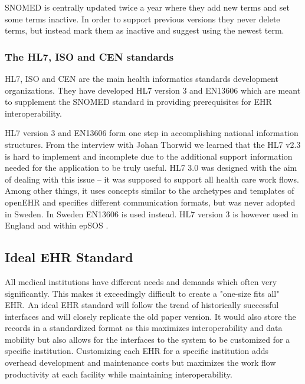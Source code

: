 \documentclass[14pt]{article}
\begin{document}
\gls{SNOMED} is centrally updated twice a year where they add new terms and set some terms inactive. In order to support previous versions they never delete terms, but instead mark them as inactive and suggest using the newest term.\cite{annavik}

\subsubsection{The HL7, ISO and CEN standards}
\gls{HL7}, \gls{ISO} and \gls{CEN} are the main health informatics standards development organizations. They have developed \gls{HL7} version 3 and \gls{EN13606} which are meant to supplement the \gls{SNOMED} standard in providing prerequisites for \gls{EHR} \gls{interoperability}.

\gls{HL7} version 3 and \gls{EN13606} form one step in accomplishing national information structures. From the interview with Johan Thorwid \cite{Cambio} we learned that the \gls{HL7} v2.3 is hard to implement and incomplete due to the additional support information needed for the application to be truly useful. \gls{HL7} 3.0 was designed with the aim of dealing with this issue – it was supposed to support all health care work flows. Among other things, it uses concepts similar to the archetypes and templates of \gls{openEHR} and specifies different communication formats, but was never adopted in Sweden. In Sweden \gls{EN13606} is used instead. \gls{HL7} version 3 is however used in England \cite{Cambio} and within epSOS \cite{epSOS}.

\subsection{Ideal EHR Standard}
All medical institutions have different needs and demands which often very significantly. This makes it exceedingly difficult to create a "one-size fits all" \gls{EHR}. An ideal \gls{EHR} standard will follow the trend of historically successful interfaces and will closely replicate the old paper version. It would also store the records in a standardized format as this maximizes interoperability and data mobility but also allows for the interfaces to the system to be customized for a specific institution. Customizing each \gls{EHR} for a specific institution adds overhead development and maintenance costs but maximizes the work flow productivity at each facility while maintaining interoperability. 
\end{document}
